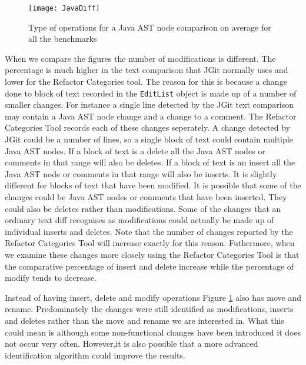 \begin{figure}[p] 
 \begin{center}
 \texttt{[image: JavaDiff]}
 \end{center}
 \caption{Type of operations for a Java AST node comparison on average for all the benchmarks}
 \label{fig:javaDifference}
\end{figure}

When we compare the figures the number of modifications is different.
The percentage is much higher in the text comparison that JGit normally uses and lower for the Refactor Categories tool.
The reason for this is because a change done to block of text recorded in the \lstinline{EditList} object is made up of a number of smaller changes.  
For instance a single line detected by the JGit text comparison may contain a Java AST node change and a change to a comment.
The Refactor Categories Tool records each of these changes seperately.
A change detected by JGit could be a number of lines, so a single block of text could contain multiple Java AST nodes.  
If a block of text is a delete all the Java AST nodes or comments in that range will also be deletes. 
If a block of text is an insert all the Java AST node or comments in that range will also be inserts.
It is slightly different for blocks of text that have been modified.
It is possible that some of the changes could be Java AST nodes or comments that have been inserted.
They could also be deletes rather than modifications.
Some of the changes that an ordinary text diff recognises as modifications could actually be made up of individual inserts and deletes.
Note that the number of changes reported by the Refactor Categories Tool will increase exactly for this reason.
Futhermore, when we examine these changes more closely using the Refactor Categories Tool is that the comparative percentage of insert and delete increase while the percentage of modify tends to decrease.  

Instead of having insert, delete and modify operations Figure \ref{fig:javaDifference} also has move and rename.
Predominately the changes were still identified as modifications, inserts and deletes rather than the move and rename we are interested in.
What this could mean is although some non-functional changes have been introduced it does not occur very often.  
However,it is also possible that a more advanced identification algorithm could improve the results. 

